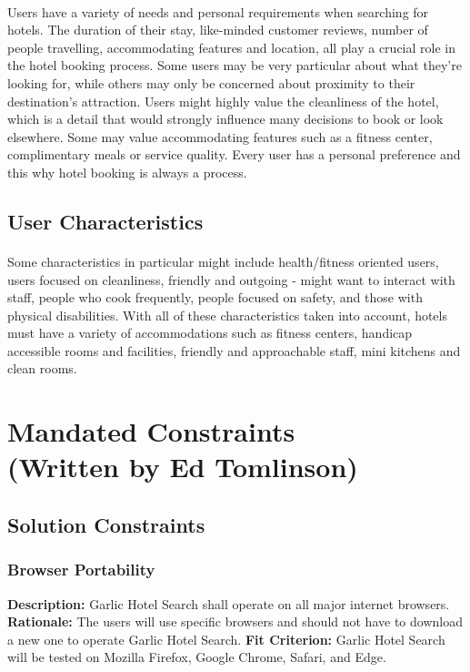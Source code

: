 \documentclass[]{article}
\begin{document}
\paragraph{}
Users have a variety of needs and personal requirements when searching for hotels. The duration of their stay, like-minded customer reviews, number of people travelling, accommodating features and location, all play a crucial role in the hotel booking process. Some users may be very particular about what they’re looking for, while others may only be concerned about proximity to their destination’s attraction. Users might highly value the cleanliness of the hotel, which is a detail that would strongly influence many decisions to book or look elsewhere. Some may value accommodating features such as a fitness center, complimentary meals or service quality. Every user has a personal preference and this why hotel booking is always a process.
\subsection{User Characteristics}
\paragraph{}
Some characteristics in particular might include health/fitness oriented users, users focused on cleanliness, friendly and outgoing - might want to interact with staff, people who cook frequently, people focused on safety, and those with physical disabilities. With all of these characteristics taken into account, hotels must have a variety of accommodations such as fitness centers, handicap accessible rooms and facilities, friendly and approachable staff, mini kitchens and clean rooms.

\section{Mandated Constraints\\ (Written by Ed Tomlinson)}
\subsection{Solution Constraints}

\subsubsection{Browser Portability}
\textbf{Description:} Garlic Hotel Search shall operate on all major internet browsers.\newline
\textbf{Rationale:} The users will use specific browsers and should not have to download a new one to operate Garlic Hotel Search.\newline
\textbf{Fit Criterion:} Garlic Hotel Search will be tested on Mozilla Firefox, Google Chrome, Safari, and Edge.
\end{document}
